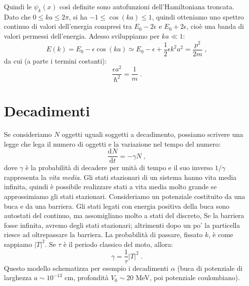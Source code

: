 \documentclass[10pt,a4paper]{report}
\theoremstyle{definition}
\newcommand{\dev}[3][]{\frac{\mathrm{d}^{#1} #2}{\mathrm{d} #3^{#1}}}
\numberwithin{equation}{section}
\begin{document}
Quindi le $\psi_k(x)$ così definite sono autofunzioni dell'Hamiltoniana troncata. Dato che $0\le ka\le 2\pi$, si ha $-1\le \cos(ka)\le 1$, quindi otteniamo uno spettro continuo di valori dell'energia compresi tra $E_0-2\epsilon$ e $E_0+2\epsilon$, cioè una banda di valori permessi dell'energia. Adesso sviluppiamo per $ka\ll 1$:
\begin{equation}
E(k)=E_0-\epsilon\cos(ka)\simeq E_0-\epsilon+\frac{1}{2}\epsilon k^2a^2=\frac{p^2}{2m}\;,
\end{equation}
da cui (a parte i termini costanti):
\begin{equation}
\frac{\epsilon a^2}{\hbar^2}=\frac{1}{m}\;.
\end{equation}
\section{Decadimenti}
Se consideriamo $N$ oggetti uguali soggetti a decadimento, possiamo scrivere una legge che lega il numero di oggetti e la variazione nel tempo del numero:
\begin{equation}
\dev{N}{t}=-\gamma N\;,
\end{equation}
dove $\gamma$ è la probabilità di decadere per unità di tempo e il suo inverso $1/\gamma$ rappresenta la \textit{vita media}. Gli stati stazionari di un sistema hanno vita media infinita, quindi è possibile realizzare stati a vita media molto grande se approssimiamo gli stati stazionari. Consideriamo un potenziale costituito da una buca e da una barriera. Gli stati legati con energia positiva della buca sono autostati del continuo, ma assomigliano molto a stati del discreto, Se la barriera fosse infinita, avremo degli stati stazionari; altrimenti dopo un po' la particella riesce ad oltrepassare la barriera. La probabilità di passare, fissato $k$, è come sappiamo $|T|^2$. Se $\tau$ è il periodo classico del moto, allora:
\begin{equation}
\gamma=\frac{1}{\tau}|T|^2\;.
\end{equation}
Questo modello schematizza per esempio i decadimenti $\alpha$ (buca di potenziale di larghezza $a\sim 10^{-13}$ cm, profondità $V_0\sim 20$ MeV, poi potenziale coulombiano).
\end{document}
